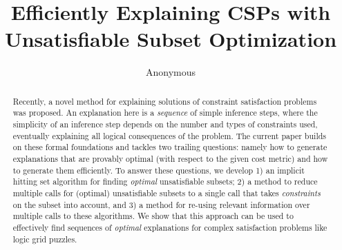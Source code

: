 \documentclass{article}
\title{Efficiently Explaining CSPs with Unsatisfiable Subset Optimization}
\author{Anonymous}
\newcommand\maxsat{MaxSAT\xspace}
\begin{document}
 
\maketitle

\begin{abstract}
Recently, a novel method for explaining solutions of constraint satisfaction problems was proposed. 
% 
An explanation here is a \textit{sequence} of simple inference steps, where the simplicity of an inference step depends on the number and types of constraints used, eventually explaining all logical consequences of the problem. 
The current paper %
builds on these formal foundations and tackles two trailing questions: namely how to generate explanations that are provably optimal (with respect to the given cost metric) and how to generate them efficiently. 
To answer these questions, we develop 1) an implicit hitting set algorithm for finding \textit{optimal} unsatisfiable subsets; 2) a method to reduce multiple calls for (optimal) unsatisfiable subsets to a single call that takes \emph{constraints} on the subset into account, and 3) a method for re-using relevant information over multiple calls to these algorithms. 
We show that this approach can be used to effectively find sequences of \textit{optimal} explanations for complex satisfaction problems like logic grid puzzles.
\end{abstract}
\end{document}
